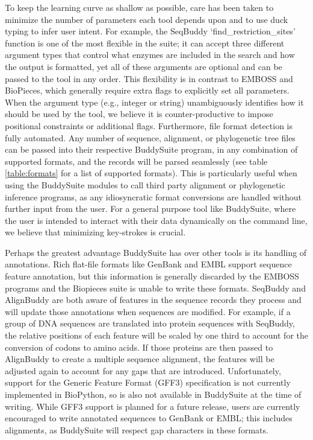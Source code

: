 \documentclass[twocolumn]{bmcart}%
\begin{document}
To keep the learning curve as shallow as possible, care has been taken to minimize the number of parameters each tool depends upon and to use duck typing to infer user intent. For example, the SeqBuddy `find\_restriction\_sites' function is one of the most flexible in the suite; it can accept three different argument types that control what enzymes are included in the search and how the output is formatted, yet all of these arguments are optional and can be passed to the tool in any order. This flexibility is in contrast to EMBOSS and BioPieces, which generally require extra flags to explicitly set all parameters. When the argument type (e.g., integer or string) unambiguously identifies how it should be used by the tool, we believe it is counter-productive to impose positional constraints or additional flags. Furthermore, file format detection is fully automated. Any number of sequence, alignment, or phylogenetic tree files can be passed into their respective BuddySuite program, in any combination of supported formats, and the records will be parsed seamlessly (see table \ref{table:formats} for a list of supported formats). This is particularly useful when using the BuddySuite modules to call third party alignment or phylogenetic inference programs, as any idiosyncratic format conversions are handled without further input from the user. For a general purpose tool like BuddySuite, where the user is intended to interact with their data dynamically on the command line, we believe that minimizing key-strokes is crucial.

Perhaps the greatest advantage BuddySuite has over other tools is its handling of annotations. Rich flat-file formats like GenBank and EMBL support sequence feature annotation, but this information is generally discarded by the EMBOSS programs and the Biopieces suite is unable to write these formats. SeqBuddy and AlignBuddy are both aware of features in the sequence records they process and will update those annotations when sequences are modified. For example, if a group of DNA sequences are translated into protein sequences with SeqBuddy, the relative positions of each feature will be scaled by one third to account for the conversion of codons to amino acids. If those proteins are then passed to AlignBuddy to create a multiple sequence alignment, the features will be adjusted again to account for any gaps that are introduced. Unfortunately, support for the Generic Feature Format (GFF3) specification is not currently implemented in BioPython, so is also not available in BuddySuite at the time of writing. While GFF3 support is planned for a future release, users are currently encouraged to write annotated sequences to GenBank or EMBL; this includes alignments, as BuddySuite will respect gap characters in these formats.
\end{document}
